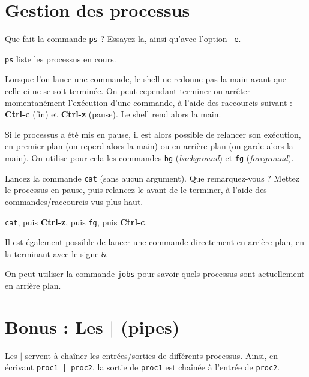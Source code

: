 \documentclass{scrartcl}
\begin{document}
\section{Gestion des processus}

\begin{question}[name=Q.]
	Que fait la commande \lstinline|ps| ? Essayez-la, ainsi qu'avec l'option \lstinline|-e|.
\end{question}
\begin{solution}
	\lstinline|ps| liste les processus en cours.
\end{solution}

Lorsque l'on lance une commande, le shell ne redonne pas la main avant que celle-ci ne se soit terminée. On peut cependant terminer ou arrêter momentanément l’exécution d'une commande, à l'aide des raccourcis suivant : \textbf{Ctrl-c} (fin) et \textbf{Ctrl-z} (pause). Le shell rend alors la main.

Si le processus a été mis en pause, il est alors possible de relancer son exécution, en premier plan (on reperd alors la main) ou en arrière plan (on garde alors la main). On utilise pour cela les commandes \lstinline|bg| (\emph{background}) et \lstinline|fg| (\emph{foreground}).

\begin{question}[name=Q.]
	Lancez la commande \lstinline|cat| (sans aucun argument). Que remarquez-vous ? Mettez le processus en pause, puis relancez-le avant de le terminer, à l'aide des commandes/raccourcis vus plus haut.
\end{question}
\begin{solution}
	\lstinline|cat|, puis \textbf{Ctrl-z}, puis \lstinline|fg|, puis \textbf{Ctrl-c}.
\end{solution}

Il est également possible de lancer une commande directement en arrière plan, en la terminant avec le signe \lstinline|&|.

On peut utiliser la commande \lstinline|jobs| pour savoir quels processus sont actuellement en arrière plan.

\clearpage

\section{Bonus : Les $|$ (pipes)}

Les $|$ servent à chaîner les entrées/sorties de différents processus. Ainsi, en écrivant \lstinline-proc1 | proc2-, la sortie de \lstinline|proc1| est chaînée à l'entrée de \lstinline|proc2|.
\end{document}
